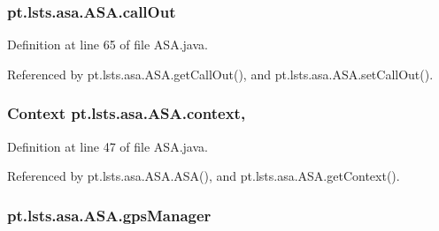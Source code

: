 \hypertarget{classpt_1_1lsts_1_1asa_1_1ASA_aedf7af794060d789656aa41a10649684}{}
\subsubsection[{call\+Out}]{ pt.\+lsts.\+asa.\+A\+S\+A.\+call\+Out\hspace{0.3cm}{\ttfamily [private]}}\label{classpt_1_1lsts_1_1asa_1_1ASA_aedf7af794060d789656aa41a10649684}


Definition at line 65 of file A\+S\+A.\+java.



Referenced by pt.\+lsts.\+asa.\+A\+S\+A.\+get\+Call\+Out(), and pt.\+lsts.\+asa.\+A\+S\+A.\+set\+Call\+Out().

\hypertarget{classpt_1_1lsts_1_1asa_1_1ASA_ad16e2c7db27b0a63a471c62f1fdcc1df}{}
\subsubsection[{context}]{\setlength{\rightskip}{0pt plus 5cm}Context pt.\+lsts.\+asa.\+A\+S\+A.\+context\hspace{0.3cm}{\ttfamily [static]}, {\ttfamily [private]}}\label{classpt_1_1lsts_1_1asa_1_1ASA_ad16e2c7db27b0a63a471c62f1fdcc1df}


Definition at line 47 of file A\+S\+A.\+java.



Referenced by pt.\+lsts.\+asa.\+A\+S\+A.\+A\+S\+A(), and pt.\+lsts.\+asa.\+A\+S\+A.\+get\+Context().

\hypertarget{classpt_1_1lsts_1_1asa_1_1ASA_a3231592629454d15eb368a68b7c59ddd}{}
\subsubsection[{gps\+Manager}]{ pt.\+lsts.\+asa.\+A\+S\+A.\+gps\+Manager\hspace{0.3cm}{\ttfamily [static]}}\label{classpt_1_1lsts_1_1asa_1_1ASA_a3231592629454d15eb368a68b7c59ddd}


